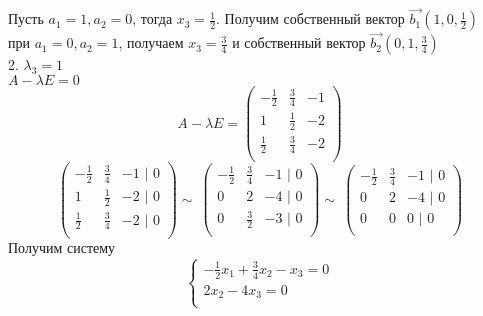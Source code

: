 \documentclass{article}
\begin{document}
    Пусть $a_1 = 1, a_2 = 0$, тогда $x_3 = \frac{1}{2}$. Получим собственный вектор $\overrightarrow{b_1}(1,0,\frac{1}{2})$ \\
    при $a_1 = 0, a_2 = 1$, получаем $x_3 = \frac{3}{4}$ и собственный вектор $\overrightarrow{b_2}(0,1,\frac{3}{4})$ \\
    2. $\lambda_3 = 1$ \\
    $A - \lambda E = 0$ \\
    \begin{equation*}
        A -\lambda E = 
        \begin{pmatrix}
            -\frac{1}{2}& \frac{3}{4}& -1\\
            1& \frac{1}{2}& -2\\
            \frac{1}{2}& \frac{3}{4}& -2\\
        \end{pmatrix}
    \end{equation*}
    \begin{equation*}
        \begin{pmatrix}
            -\frac{1}{2}& \frac{3}{4}& -1 \text{ |  0}\\
            1& \frac{1}{2}& -2 \text{ |  0}\\
            \frac{1}{2}& \frac{3}{4}& -2\text{ |  0}\\
        \end{pmatrix}
        \sim{~} 
        \begin{pmatrix}
            -\frac{1}{2}& \frac{3}{4}& -1 \text{ |  0}\\
            0& 2& -4 \text{ |  0}\\
            0& \frac{3}{2}& -3\text{ |  0}\\
        \end{pmatrix}
        \sim{~} 
        \begin{pmatrix}
            -\frac{1}{2}& \frac{3}{4}& -1 \text{ |  0}\\
            0& 2& -4 \text{ |  0}\\
            0& 0& 0\text{ |  0}\\
        \end{pmatrix}
    \end{equation*}
    Получим систему
    \begin{equation*}
        \begin{cases}
            -\frac{1}{2}x_1 + \frac{3}{4}x_2 - x_3 = 0 \\
            2x_2 - 4 x_3 = 0 \\
        \end{cases}
    \end{equation*}  
\end{document}
